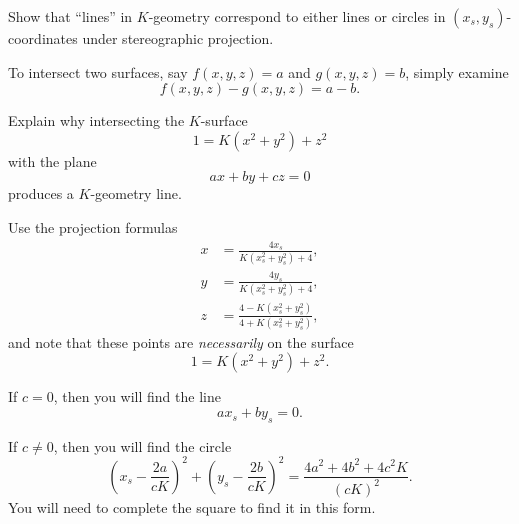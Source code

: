 \documentclass{ximera}
\begin{document}
\begin{problem}
  Show that ``lines'' in $K$-geometry correspond to either lines or
  circles in $(x_{s},y_{s})$-coordinates under stereographic
  projection.

\begin{hint}
  To intersect two surfaces, say $f(x,y,z)=a$ and $g(x,y,z)=b$,
  simply examine
  \[
  f(x,y,z)-g(x,y,z) = a-b.
  \]
\end{hint}

\begin{hint}
  Explain why intersecting the $K$-surface
  \[
  1 = K\left(x^2+y^2\right) + z^2 
  \]
  with the plane
  \[
  ax+by+cz = 0
  \]
  produces a $K$-geometry line.
\end{hint}

\begin{hint}
  Use the projection formulas
  \begin{align*}
      x &= \frac{4x_s}{K\left(x_s^2 + y_s^2\right) + 4},\\
      y &= \frac{4y_s}{K\left(x_s^2 + y_s^2\right) + 4},\\
      z &= \frac{4-K\left(x_s^2 + y_s^2\right)}{4+K\left(x_s^2 + y_s^2\right)},
  \end{align*}
  and note that these points are \textit{necessarily} on the surface
  \[
  1 = K\left(x^2+y^2\right) + z^2.
  \]
\end{hint}

\begin{hint}
  If $c=0$, then you will find the line
  \[
   ax_s + by_s = 0.
  \]
\end{hint}

\begin{hint}
  If $c\ne 0$, then you will find the circle
  \[
   \left(x_s - \frac{2a}{cK}\right)^2 + \left(y_s -
   \frac{2b}{cK}\right)^2 = \frac{4a^2 + 4b^2 + 4c^2K}{(cK)^2}.
   \]
   You will need to complete the square to find it in this form.
\end{hint}


\end{problem}
\end{document}
